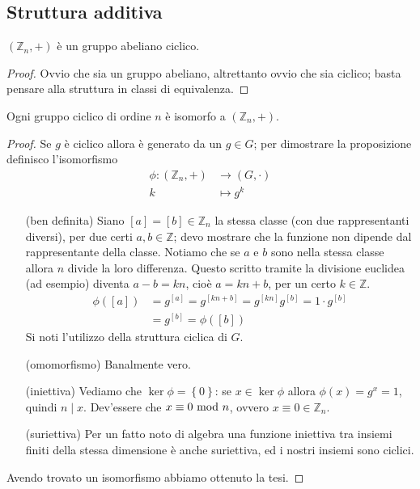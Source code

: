 \subsection{Struttura additiva}
\begin{proposizione}
	$\left(\mathbb{Z}_n,+\right)$ è un gruppo abeliano ciclico.
\end{proposizione}
\begin{proof}
	Ovvio che sia un gruppo abeliano, altrettanto ovvio che sia ciclico; basta pensare alla struttura in classi di equivalenza.
\end{proof}
\begin{proposizione}
	Ogni gruppo ciclico di ordine $n$ è isomorfo a $\left(\mathbb{Z}_n,+\right)$. 
\end{proposizione}
\begin{proof}
	Se $g$ è ciclico allora è generato da un $g\in G$; per dimostrare la proposizione definisco l'isomorfismo
	\begin{align*}
	\phi:(\mathbb{Z}_n,+)&\longrightarrow (G,\cdot)\\
	k &\longmapsto g^k
	\end{align*}
	\begin{itemize}
		\item[(ben definita)] Siano $[a]=[b]\in\mathbb{Z}_n$ la stessa classe (con due rappresentanti diversi), per due certi $a,b\in\mathbb{Z}$; devo mostrare che la funzione non dipende dal rappresentante della classe. Notiamo che se $a$ e $b$ sono nella stessa classe allora $n$ divide la loro differenza. Questo scritto tramite la divisione euclidea (ad esempio) diventa $a-b=kn$, cioè $a=kn+b$, per un certo $k\in\mathbb{Z}$.
		\begin{align*}
		\phi([a])&=g^{[a]}=g^{[kn+b]}=g^{[kn]}g^{[b]}=1\cdot g^{[b]}\\
		&=g^{[b]}=\phi([b])
		\end{align*}
		Si noti l'utilizzo della struttura ciclica di $G$.
		\item[(omomorfismo)] Banalmente vero.
		\item[(iniettiva)] Vediamo che $\ker \phi = \left\{0\right\}$: se $x \in \ker \phi$ allora $\phi(x) = g^x = 1$, quindi $n \mid x$. Dev'essere che $x \equiv 0 \ \mathrm{mod}\ n$, ovvero $x \equiv 0 \in \mathbb{Z}_n$. 
		\item[(suriettiva)] Per un fatto noto di algebra una funzione iniettiva tra insiemi finiti della stessa dimensione è anche suriettiva, ed i nostri insiemi sono ciclici.
	\end{itemize}
	Avendo trovato un isomorfismo abbiamo ottenuto la tesi.
\end{proof}
